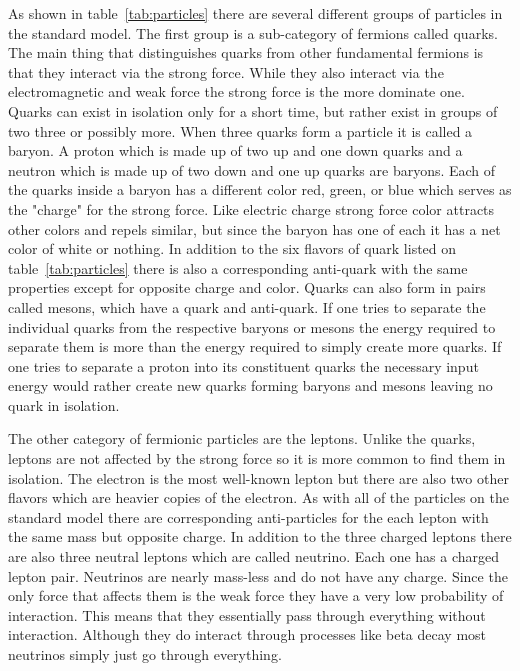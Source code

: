 As shown in table~\ref{tab:particles} there are several different groups of particles in the standard model. The first group is a sub-category of fermions called quarks. The main thing that distinguishes quarks from other fundamental fermions is that they interact via the strong force. While they also interact via the electromagnetic and weak force the strong force is the more dominate one. Quarks can exist in isolation only for a short time, but rather exist in groups of two three or possibly more. When three quarks form a particle it is called a baryon. A proton which is made up of two up and one down quarks and a neutron which is made up of two down and one up quarks are baryons. Each of the quarks inside a baryon has a different color red, green, or blue which serves as the "charge" for the strong force. Like electric charge strong force color attracts other colors and repels similar, but since the baryon has one of each it has a net color of white or nothing. In addition to the six flavors of quark listed on table~\ref{tab:particles} there is also a corresponding anti-quark with the same properties except for opposite charge and color. Quarks can also form in pairs called mesons, which have a quark and anti-quark. If one tries to separate the individual quarks from the respective baryons or mesons the energy required to separate them is more than the energy required to simply create more quarks. If one tries to separate a proton into its constituent quarks the necessary input energy would rather create new quarks forming baryons and mesons leaving no quark in isolation. 

The other category of fermionic particles are the leptons. Unlike the quarks, leptons are not affected by the strong force so it is more common to find them in isolation. The electron is the most well-known lepton but there are also two other flavors which are heavier copies of the electron. As with all of the particles on the standard model there are corresponding anti-particles for the each lepton with the same mass but opposite charge. In addition to the three charged leptons there are also three neutral leptons which are called neutrino. Each one has a charged lepton pair. Neutrinos are nearly mass-less and do not have any charge. Since the only force that affects them is the weak force they have a very low probability of interaction. This means that they essentially pass through everything without interaction. Although they do interact through processes like beta decay most neutrinos simply just go through everything. 

